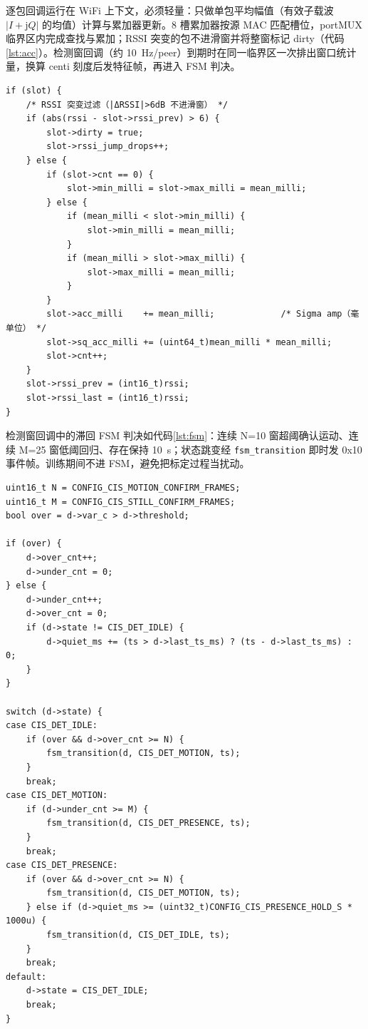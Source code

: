 逐包回调运行在 WiFi 上下文，必须轻量：只做单包平均幅值（有效子载波 $|I+\mathrm{j}Q|$ 的均值）计算与累加器更新。8 槽累加器按源 MAC 匹配槽位，portMUX 临界区内完成查找与累加；RSSI 突变的包不进滑窗并将整窗标记 dirty（代码\ref{lst:acc}）。检测窗回调（约 10~Hz/peer）到期时在同一临界区一次排出窗口统计量，换算 centi 刻度后发特征帧，再进入 FSM 判决。

\begin{lstlisting}[style=cstyle, caption={逐包累加与 RSSI 突变过滤（cis\_detect.c 节选）}, label={lst:acc}]
if (slot) {
    /* RSSI 突变过滤（|ΔRSSI|>6dB 不进滑窗） */
    if (abs(rssi - slot->rssi_prev) > 6) {
        slot->dirty = true;
        slot->rssi_jump_drops++;
    } else {
        if (slot->cnt == 0) {
            slot->min_milli = slot->max_milli = mean_milli;
        } else {
            if (mean_milli < slot->min_milli) {
                slot->min_milli = mean_milli;
            }
            if (mean_milli > slot->max_milli) {
                slot->max_milli = mean_milli;
            }
        }
        slot->acc_milli    += mean_milli;             /* Sigma amp（毫单位） */
        slot->sq_acc_milli += (uint64_t)mean_milli * mean_milli;
        slot->cnt++;
    }
    slot->rssi_prev = (int16_t)rssi;
    slot->rssi_last = (int16_t)rssi;
}
\end{lstlisting}

检测窗回调中的滞回 FSM 判决如代码\ref{lst:fsm}：连续 N=10 窗超阈确认运动、连续 M=25 窗低阈回归、存在保持 10~s；状态跳变经 \texttt{fsm\_transition} 即时发 0x10 事件帧。训练期间不进 FSM，避免把标定过程当扰动。

\begin{lstlisting}[style=cstyle, caption={滞回状态机判决（cis\_detect.c 节选）}, label={lst:fsm}]
uint16_t N = CONFIG_CIS_MOTION_CONFIRM_FRAMES;
uint16_t M = CONFIG_CIS_STILL_CONFIRM_FRAMES;
bool over = d->var_c > d->threshold;

if (over) {
    d->over_cnt++;
    d->under_cnt = 0;
} else {
    d->under_cnt++;
    d->over_cnt = 0;
    if (d->state != CIS_DET_IDLE) {
        d->quiet_ms += (ts > d->last_ts_ms) ? (ts - d->last_ts_ms) : 0;
    }
}

switch (d->state) {
case CIS_DET_IDLE:
    if (over && d->over_cnt >= N) {
        fsm_transition(d, CIS_DET_MOTION, ts);
    }
    break;
case CIS_DET_MOTION:
    if (d->under_cnt >= M) {
        fsm_transition(d, CIS_DET_PRESENCE, ts);
    }
    break;
case CIS_DET_PRESENCE:
    if (over && d->over_cnt >= N) {
        fsm_transition(d, CIS_DET_MOTION, ts);
    } else if (d->quiet_ms >= (uint32_t)CONFIG_CIS_PRESENCE_HOLD_S * 1000u) {
        fsm_transition(d, CIS_DET_IDLE, ts);
    }
    break;
default:
    d->state = CIS_DET_IDLE;
    break;
}
\end{lstlisting}

